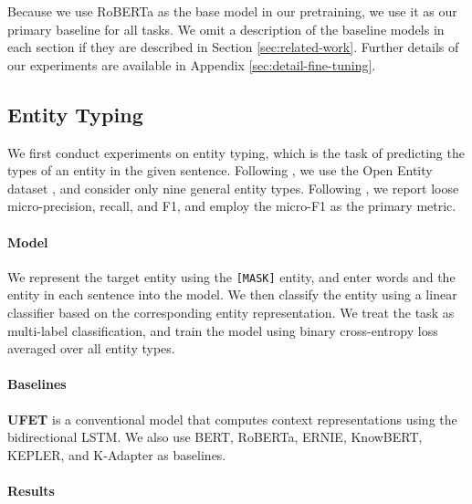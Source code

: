 \documentclass[11pt,a4paper]{article}
\begin{document}
Because we use RoBERTa as the base model in our pretraining, we use it as our primary baseline for all tasks.
We omit a description of the baseline models in each section if they are described in Section \ref{sec:related-work}.
Further details of our experiments are available in Appendix \ref{sec:detail-fine-tuning}.

\subsection{Entity Typing}

We first conduct experiments on entity typing, which is the task of predicting the types of an entity in the given sentence.
Following , we use the Open Entity dataset \cite{Choi2018Ultra-FineTyping}, and consider only nine general entity types.
Following , we report loose micro-precision, recall, and F1, and employ the micro-F1 as the primary metric.

\paragraph{Model}

We represent the target entity using the \texttt{[MASK]} entity, and enter words and the entity in each sentence into the model.
We then classify the entity using a linear classifier based on the corresponding entity representation.
We treat the task as multi-label classification, and train the model using binary cross-entropy loss averaged over all entity types.

\paragraph{Baselines}

\textbf{UFET} \cite{Choi2018Ultra-FineTyping} is a conventional model that computes context representations using the bidirectional LSTM.
We also use BERT, RoBERTa, ERNIE, KnowBERT, KEPLER, and K-Adapter as baselines.

\paragraph{Results}
\end{document}
